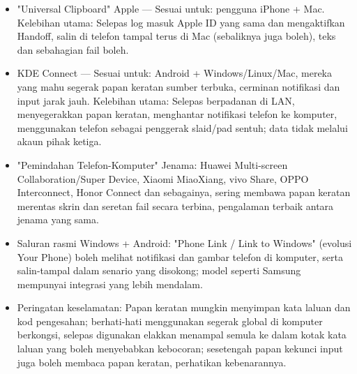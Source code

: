 
\begin{itemize}
  \item "Universal Clipboard" Apple — Sesuai untuk: pengguna iPhone + Mac. Kelebihan utama: Selepas log masuk Apple ID yang sama dan mengaktifkan Handoff, salin di telefon tampal terus di Mac (sebaliknya juga boleh), teks dan sebahagian fail boleh.
  \item KDE Connect — Sesuai untuk: Android + Windows/Linux/Mac, mereka yang mahu segerak papan keratan sumber terbuka, cerminan notifikasi dan input jarak jauh. Kelebihan utama: Selepas berpadanan di LAN, menyegerakkan papan keratan, menghantar notifikasi telefon ke komputer, menggunakan telefon sebagai penggerak slaid/pad sentuh; data tidak melalui akaun pihak ketiga.
  \item "Pemindahan Telefon-Komputer" Jenama: Huawei Multi-screen Collaboration/Super Device, Xiaomi MiaoXiang, vivo Share, OPPO Interconnect, Honor Connect dan sebagainya, sering membawa papan keratan merentas skrin dan seretan fail secara terbina, pengalaman terbaik antara jenama yang sama.
  \item Saluran rasmi Windows + Android: "Phone Link / Link to Windows" (evolusi Your Phone) boleh melihat notifikasi dan gambar telefon di komputer, serta salin-tampal dalam senario yang disokong; model seperti Samsung mempunyai integrasi yang lebih mendalam.
  \item Peringatan keselamatan: Papan keratan mungkin menyimpan kata laluan dan kod pengesahan; berhati-hati menggunakan segerak global di komputer berkongsi, selepas digunakan elakkan menampal semula ke dalam kotak kata laluan yang boleh menyebabkan kebocoran; sesetengah papan kekunci input juga boleh membaca papan keratan, perhatikan kebenarannya.
\end{itemize}


